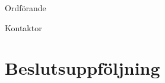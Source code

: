 \documentclass[10pt]{article}
\def\ordf{Fredrik Peterson}
\def\sekr{Erik Månsson}
\begin{document}
\begin{signatures}{2}
    \ist
    \signature{\ordf}{Ordförande}
    \signature{\sekr}{Kontaktor}
\end{signatures}

\section{Beslutsuppföljning}
\begin{busek}
\end{busek}

\begin{utskottsrapporter}
    
    
\end{utskottsrapporter}

\begin{valforslags}
\end{valforslags}

\begin{berattelser}
\end{berattelser}

\begin{stadgeandringar}
\end{stadgeandringar}

\begin{motioner}
    
\end{motioner}

\begin{propositioner}
    
    
    
    
    
    
    
\end{propositioner}

\begin{verksplaner}
    
\end{verksplaner}

\begin{verksplanuppfar}
    
\end{verksplanuppfar}
\end{document}
